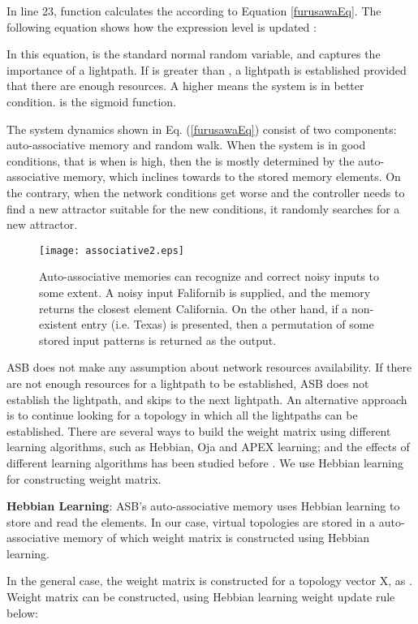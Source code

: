 \documentclass[conference]{IEEEtran}
\begin{document}
In line 23,  function calculates the   according to Equation \ref{furusawaEq}.
The following equation shows how the expression level is updated \cite{Koizumi:10}: 
{    } 

 In this equation,  is the standard normal random variable, and    captures the importance of a lightpath. 
If  is greater than ,
 a lightpath is established provided that there are enough resources. A higher    means the system is in better condition. 
 is the sigmoid function. 
  
The system dynamics shown in Eq. (\ref{furusawaEq}) consist of two components: auto-associative memory and random walk.
When the system is in good conditions,
that is when  is high, then the  is mostly determined by the auto-associative memory,
which inclines towards to the stored memory elements.
On the contrary, when the network conditions get  worse and the controller needs to find a new attractor suitable for the new conditions, 
it randomly  searches for a new attractor. 

 \begin{figure}[t] 
\centering
  \texttt{[image: associative2.eps]}
\caption{ Auto-associative memories can recognize and correct noisy inputs to some extent.
A noisy input Falifornib is supplied, and the memory returns the closest element California.
On the other hand, if a non-existent entry (i.e. Texas) is presented, then a permutation of some stored input patterns is returned as the output. 
}
\label{auto_asso}
\end{figure} 
 
ASB does not make any assumption about network resources availability. 
If there are not enough resources for a lightpath to be established,
 ASB does not establish the lightpath, and skips to the next lightpath. 
An alternative approach is to continue looking for a topology  in which all the lightpaths can be established.
There are several ways to build  the weight matrix using different learning algorithms, such as Hebbian, Oja and APEX learning; 
and the effects of different learning algorithms has been studied before \cite{Hanay:VNT012}.
We use Hebbian learning for constructing weight matrix. 

{\bf Hebbian Learning}:
ASB's auto-associative memory uses Hebbian learning to store and read the elements. In our case, virtual topologies are stored 
in a auto-associative memory of which weight matrix is constructed using Hebbian learning.
 
In the general case, the weight matrix  is constructed for a topology vector
X, as . Weight matrix can be constructed, using Hebbian learning weight update rule below:
\end{document}
